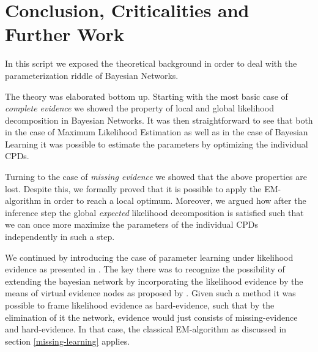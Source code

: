 \documentclass[11pt]{article}
\begin{document}
\begin{article}
\begin{algorithm*}[h!]
\begin{multicols}{2}
\begin{algorithmic}[1]
{\EndWhile
\EndProcedure

\end{algorithmic}
\end{multicols}
\end{algorithm*}

\cleardoublepage

\section{Conclusion, Criticalities and Further Work}
\label{conclusion}
In this script we exposed the theoretical background in order
to deal with the parameterization riddle of Bayesian Networks.

The theory was elaborated bottom up. Starting with the most basic
case of \emph{complete evidence} we showed the property of local and
global likelihood decomposition in Bayesian Networks. It was then
straightforward to see that both in the case of Maximum Likelihood
Estimation as well as in the case of Bayesian Learning it was
possible to estimate the parameters by optimizing the individual
CPDs.

Turning to the case of \emph{missing evidence} we showed that the above
properties are lost. Despite this, we formally proved that it is
possible to apply the EM-algorithm in order to reach a local
optimum. Moreover, we argued how after the inference step the global
\emph{expected} likelihood decomposition is satisfied such that we can
once more maximize the parameters of the individual CPDs
independently in such a step.

We continued by introducing the case of parameter learning under
likelihood evidence as presented in \cite{Wasserkrug_all}. The key
there was to recognize the possibility of extending the bayesian
network by incorporating the likelihood evidence by the means of
virtual evidence nodes as proposed by
\cite{pearl1987evidential}. Given such a method it was possible to
frame likelihood evidence as hard-evidence, such that by the
elimination of it the network, evidence would just consists of
missing-evidence and hard-evidence. In that case, the classical
EM-algorithm as discussed in section \ref{missing-learning} applies.


\end{article}
\end{document}
